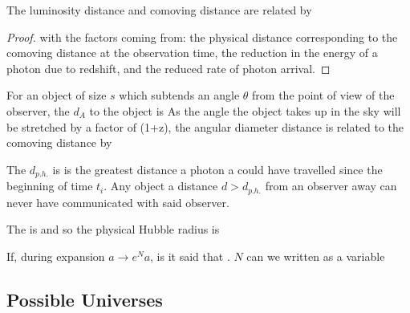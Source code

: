 \documentclass{article}
\begin{document}
 \begin{prop}
 The luminosity distance and comoving distance are related by 
 \end{prop}
\begin{proof}
with the factors coming from: the physical distance corresponding to the comoving distance at the observation time, the reduction in the energy of a photon due to redshift, and the reduced rate of photon arrival. 
\end{proof}

\begin{definition}
For an object of size $s$ which subtends an angle $\theta$ from the point of view of the observer, the  $d_A$ to the object is 
As the angle the object takes up in the sky will be stretched by a factor of (1+z), the angular diameter distance is related to the comoving distance by 
\end{definition}

\begin{definition}
The  $d_{p.h.}$ is is the greatest distance a photon a could have travelled since the beginning of time $t_i$. Any object a distance $d>d_{p.h.}$ from an observer away can never have communicated with said observer. 
\end{definition}

\begin{definition}
The  is 
and so the physical Hubble radius is 
\end{definition}

\begin{definition}[e-folds]
If, during expansion $a \to e^N a$, is it said that . $N$ can we written as a variable 
\end{definition}

\subsection{Possible Universes}
\end{document}
